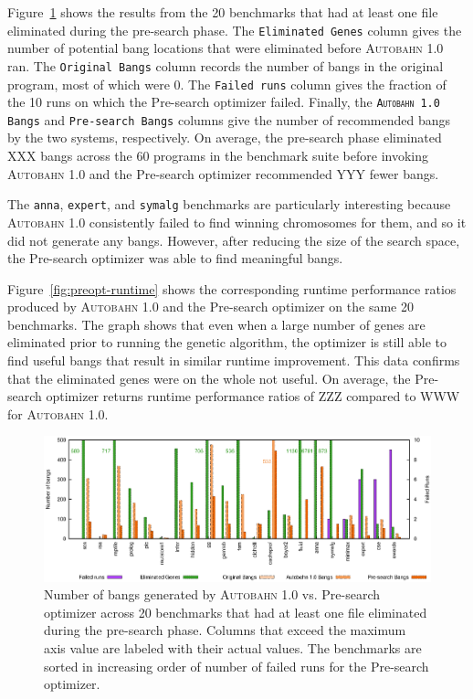 \documentclass[format=sigplan, review=true]{acmart}
\newcommand{\figref}[1]{Figure~\ref{#1}}
\newcommand{\useful}[0]{useful}
\newcommand{\Ao}[0]{\textsc{Autobahn 1.0}}
\newcommand{\preopt}[0]{pre-search}
\newcommand{\Preopt}[0]{Pre-search}
\newcommand{\preoptElim}[0]{XXX}
\newcommand{\preoptFewerBangs}[0]{YYY}
\newcommand{\preoptPerformance}[0]{ZZZ}
\newcommand{\AoPerformance}[0]{WWW}
\begin{document}
\figref{fig:preopt-bangs} shows the results from the 20 benchmarks that
had at least one file eliminated during the \preopt{} phase. The
\texttt{Eliminated Genes} column gives the number of potential bang
locations that were eliminated before \Ao{} ran. 
The \texttt{Original Bangs} column records the number of bangs in the
original program, most of which were 0. 
The \texttt{Failed runs} column gives the fraction of the 10 runs on
which the \Preopt{} optimizer failed. 
Finally, the \texttt{\Ao{} Bangs} and \texttt{\Preopt{} Bangs} columns
give the number of recommended bangs by the two systems,
respectively.  On average, the \preopt{} phase eliminated
\preoptElim{} bangs across the 60 programs in the benchmark suite before
invoking \Ao{} and the \Preopt{} optimizer recommended \preoptFewerBangs{} fewer
bangs. 

The \texttt{anna}, \texttt{expert}, and \texttt{symalg} benchmarks are
particularly interesting because \Ao{} consistently failed to find
winning chromosomes for them, and so it did not generate any bangs. However,
after reducing the size of the search space, the \Preopt{}
optimizer was able to find meaningful bangs.

\figref{fig:preopt-runtime} shows the corresponding runtime
performance ratios produced by \Ao{} and the \Preopt{} optimizer on
the same 20 benchmarks.
The graph shows that even when a large number of genes are
eliminated prior to running the genetic algorithm, the optimizer is still able to
find \useful{} bangs that result in similar runtime improvement. This data
confirms that the eliminated genes were on the whole not \useful{}.
On average, the \Preopt{} optimizer returns runtime performance ratios
of \preoptPerformance{} compared to \AoPerformance{} for \Ao.

\begin{figure}
\includegraphics[width=\textwidth]{pre-aut-bangs}
\caption{Number of bangs generated by \Ao{} vs. \Preopt{} optimizer across 20 benchmarks that had at least
one file eliminated during the \preopt{} phase. Columns that exceed
the maximum axis value are labeled with their actual values. The
benchmarks are sorted in increasing order of number of failed runs for
the \Preopt{} optimizer.}
\label{fig:preopt-bangs}
\end{figure}
\end{document}
